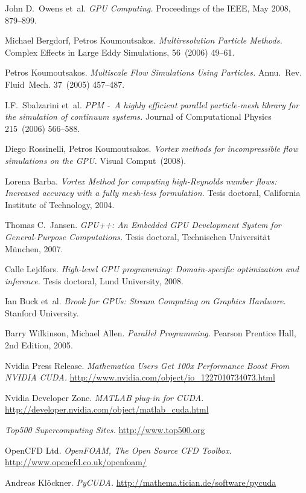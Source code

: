\documentclass[11pt,spanish]{article}
\newcommand{\reftitle}{\textit}
\begin{document}
\newpage
\begin{thebibliography}{99}
    John D.~Owens et~al.
    \reftitle{GPU Computing.}
    Proceedings of the IEEE, May 2008, 879--899.

    Michael Bergdorf, Petros Koumoutsakos.
    \reftitle{Multiresolution Particle Methods.}
    Complex Effects in Large Eddy Simulations, 56~(2006) 49--61.

    Petros Koumoutsakos.
    \reftitle{Multiscale Flow Simulations Using Particles.}
    Annu.~Rev. Fluid~Mech. 37~(2005) 457--487.

    I.F.~Sbalzarini et~al.
    \reftitle{PPM -~A highly efficient parallel particle-mesh library
      for the simulation of continuum systems.}
    Journal of Computational Physics 215~(2006) 566--588.

    Diego Rossinelli, Petros Koumoutsakos.
    \reftitle{Vortex methods for incompressible flow simulations on the GPU.}
    Visual Comput~(2008).

    Lorena Barba.
    \reftitle{Vortex Method for computing high-Reynolds number flows:
    Increased accuracy with a fully mesh-less formulation.}
    Tesis doctoral, California Institute of Technology, 2004.

    Thomas C.~Jansen.
    \reftitle{GPU++: An Embedded GPU Development System for
      General-Purpose Computations.}
    Tesis doctoral, Technischen Universität München, 2007.

    Calle Lejdfors.
    \reftitle{High-level GPU programming: Domain-specific optimization and inference.}
    Tesis doctoral, Lund University, 2008.

    Ian Buck et~al.
    \reftitle{Brook for GPUs: Stream Computing on Graphics Hardware.}
    Stanford University.

    Barry Wilkinson, Michael Allen.
    \reftitle{Parallel Programming.}
    Pearson Prentice Hall, 2nd Edition, 2005.

    Nvidia Press Release.
    \reftitle{Mathematica Users Get 100x Performance Boost From NVIDIA CUDA.}
    \url{http://www.nvidia.com/object/io_1227010734073.html}

    Nvidia Developer Zone.
    \reftitle{MATLAB plug-in for CUDA.}
    \url{http://developer.nvidia.com/object/matlab_cuda.html}

    \reftitle{Top500 Supercomputing Sites.}
    \url{http://www.top500.org}

    OpenCFD Ltd.
    \reftitle{OpenFOAM, The Open Source CFD Toolbox.}
    \url{http://www.opencfd.co.uk/openfoam/}

    Andreas Klöckner.
    \reftitle{PyCUDA.}
    \url{http://mathema.tician.de/software/pycuda}


\end{thebibliography}
\end{document}
